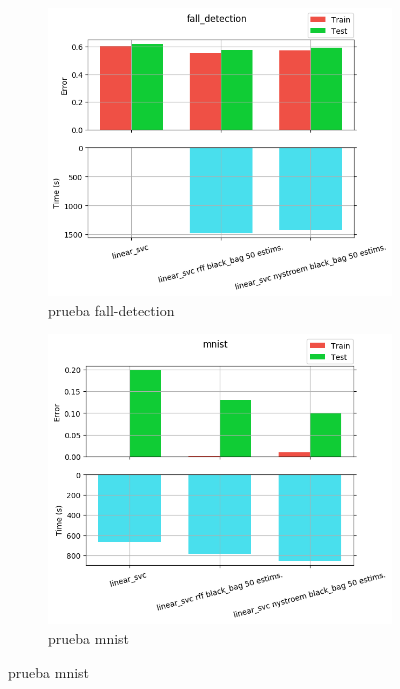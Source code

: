 \begin{figure}[ht]
  \centering
  \begin{subfigure}[b]{0.5\linewidth}
    \centering\captionsetup{width=.8\linewidth}\includegraphics[width=\imgscale\linewidth]{Figures/2_6/fall_detection}
    \caption{prueba fall-detection}
    \label{fig:2_6_fall_detection}
  \end{subfigure}%
  \begin{subfigure}[b]{0.5\linewidth}
    \centering\captionsetup{width=.8\linewidth}\includegraphics[width=\imgscale\linewidth]{Figures/2_6/mnist}
    \caption{prueba mnist}
    \label{fig:2_6_mnist}
  \end{subfigure}
\end{figure}


